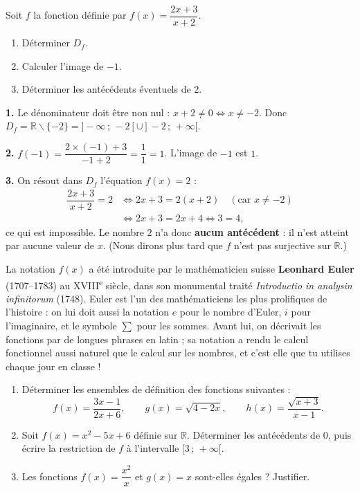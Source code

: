 \documentclass[11pt]{article}
\def\setminus{\mathbin{\backslash}}\let\smallsetminus\setminus
\begin{document}
\begin{exoresolu}
Soit $f$ la fonction définie par $f(x) = \dfrac{2x+3}{x+2}$.
\begin{enumerate}
\item Déterminer $D_f$.
\item Calculer l'image de $-1$.
\item Déterminer les antécédents éventuels de $2$.
\end{enumerate}
\tcblower
\textbf{1.} Le dénominateur doit être non nul : $x + 2 \neq 0 \iff x \neq -2$. Donc $D_f = \mathbb{R} \setminus \{-2\} = ]-\infty\,;\,-2[ \cup ]-2\,;\,+\infty[$.

\textbf{2.} $f(-1) = \dfrac{2\times(-1)+3}{-1+2} = \dfrac{1}{1} = 1$. L'image de $-1$ est $1$.

\textbf{3.} On résout dans $D_f$ l'équation $f(x) = 2$ :
\begin{align*}
\dfrac{2x+3}{x+2} = 2 &\iff 2x + 3 = 2(x+2) \quad (\text{car } x \neq -2)\\
&\iff 2x + 3 = 2x + 4 \iff 3 = 4,
\end{align*}
ce qui est impossible. Le nombre $2$ n'a donc \textbf{aucun antécédent} : il n'est atteint par aucune valeur de $x$. (Nous dirons plus tard que $f$ n'est pas surjective sur $\mathbb{R}$.)
\end{exoresolu}

\begin{savaistu}
La notation $f(x)$ a été introduite par le mathématicien suisse \textbf{Leonhard Euler} (1707--1783) au XVIII\textsuperscript{e} siècle, dans son monumental traité \emph{Introductio in analysin infinitorum} (1748). Euler est l'un des mathématiciens les plus prolifiques de l'histoire : on lui doit aussi la notation $e$ pour le nombre d'Euler, $i$ pour l'imaginaire, et le symbole $\sum$ pour les sommes. Avant lui, on décrivait les fonctions par de longues phrases en latin ; sa notation a rendu le calcul fonctionnel aussi naturel que le calcul sur les nombres, et c'est elle que tu utilises chaque jour en classe !
\end{savaistu}

\begin{exercice}
\begin{enumerate}
\item Déterminer les ensembles de définition des fonctions suivantes :
\[ f(x) = \dfrac{3x-1}{2x+6}, \qquad g(x) = \sqrt{4-2x}, \qquad h(x) = \dfrac{\sqrt{x+3}}{x-1}. \]
\item Soit $f(x) = x^2 - 5x + 6$ définie sur $\mathbb{R}$. Déterminer les antécédents de $0$, puis écrire la restriction de $f$ à l'intervalle $[3\,;\,+\infty[$.
\item Les fonctions $f(x) = \dfrac{x^2}{x}$ et $g(x) = x$ sont-elles égales ? Justifier.
\end{enumerate}
\end{exercice}
\end{document}
